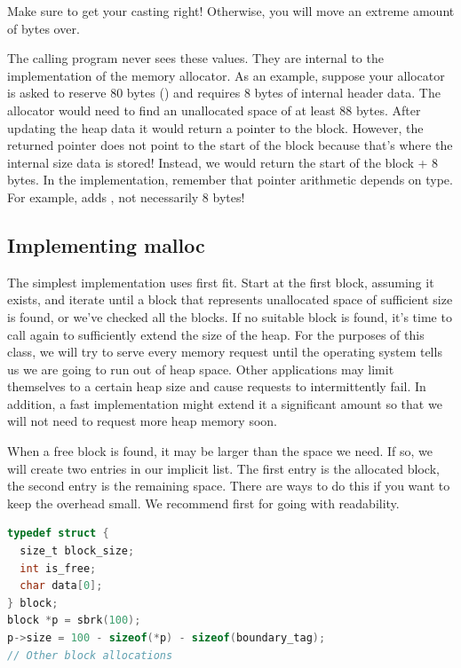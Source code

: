 Make sure to get your casting right!
Otherwise, you will move an extreme amount of bytes over.

The calling program never sees these values.
They are internal to the implementation of the memory allocator.
As an example, suppose your allocator is asked to reserve 80 bytes () and requires 8 bytes of internal header data.
The allocator would need to find an unallocated space of at least 88 bytes.
After updating the heap data it would return a pointer to the block.
However, the returned pointer does not point to the start of the block because that's where the internal size data is stored!
Instead, we would return the start of the block + 8 bytes.
In the implementation, remember that pointer arithmetic depends on type. For example,  adds , not necessarily 8 bytes!

\subsection{Implementing malloc}

The simplest implementation uses first fit.
Start at the first block, assuming it exists, and iterate until a block that represents unallocated space of sufficient size is found, or we've checked all the blocks.
If no suitable block is found, it's time to call  again to sufficiently extend the size of the heap.
For the purposes of this class, we will try to serve every memory request until the operating system tells us we are going to run out of heap space.
Other applications may limit themselves to a certain heap size and cause requests to intermittently fail.
In addition, a fast implementation might extend it a significant amount so that we will not need to request more heap memory soon.

When a free block is found, it may be larger than the space we need.
If so, we will create two entries in our implicit list.
The first entry is the allocated block, the second entry is the remaining space.
There are ways to do this if you want to keep the overhead small.
We recommend first for going with readability.

\begin{lstlisting}[language=C]
typedef struct {
  size_t block_size;
  int is_free;
  char data[0];
} block;
block *p = sbrk(100);
p->size = 100 - sizeof(*p) - sizeof(boundary_tag);
// Other block allocations
\end{lstlisting}

